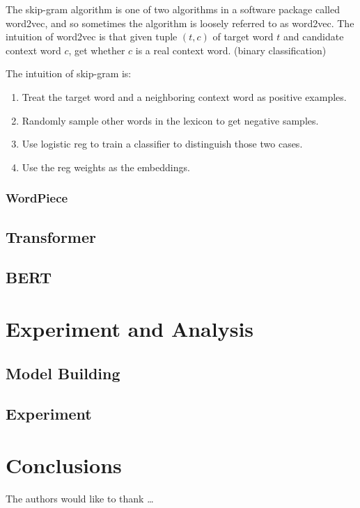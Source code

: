 The skip-gram algorithm is one of two algorithms in a software package called word2vec,
and so sometimes the algorithm is loosely referred to as word2vec. The intuition of word2vec is that
given tuple $(t, c)$ of target word $t$ and candidate context word $c$, get whether $c$ is a real context word. (binary classification)

The intuition of skip-gram is:
\begin{enumerate}
    \item Treat the target word and a neighboring context word as positive examples.
    \item Randomly sample other words in the lexicon to get negative samples.
    \item Use logistic reg to train a classifier to distinguish those two cases.
    \item Use the reg weights as the embeddings.
\end{enumerate}
\subsubsection{WordPiece}

\subsection{Transformer}
\subsection{BERT}

\section{Experiment and Analysis} \label{sec-experiment}
\subsection{Model Building}
\subsection{Experiment}
\section{Conclusions} \label{sec-conclusions}


The authors would like to thank \ldots

